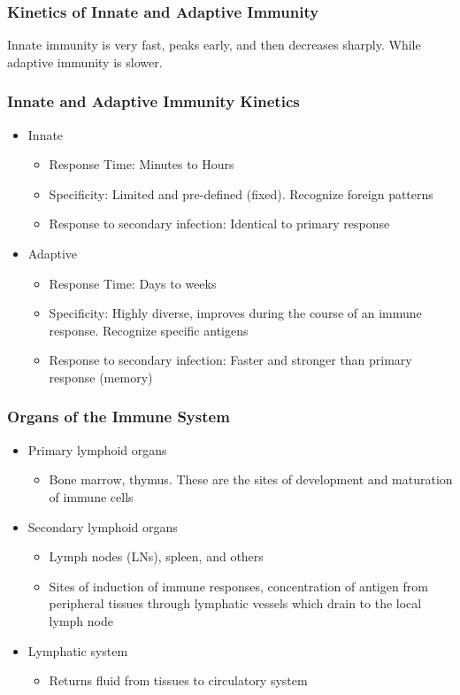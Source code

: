 \begin{itemize}
\begin{itemize}
\subsubsection{Kinetics of Innate and Adaptive Immunity}
Innate immunity is very fast, peaks early, and then decreases sharply. While adaptive immunity is slower.

\subsubsection{Innate and Adaptive Immunity Kinetics}
\begin{itemize}
    \item Innate
    \begin{itemize}
        \item Response Time: Minutes to Hours
        \item Specificity: Limited and pre-defined (fixed). Recognize foreign patterns
        \item Response to secondary infection: Identical to primary response
    \end{itemize}
    \item Adaptive
    \begin{itemize}
        \item Response Time: Days to weeks
        \item Specificity: Highly diverse, improves during the course of an immune response. Recognize specific antigens
        \item Response to secondary infection: Faster and stronger than primary  response (memory)
        
    \end{itemize}
\end{itemize}

\subsubsection{Organs of the Immune System}
\begin{itemize}
    \item Primary lymphoid organs
    \begin{itemize}
        \item Bone marrow, thymus. These are the sites of development and maturation of immune cells
    \end{itemize}
    \item Secondary lymphoid organs
    \begin{itemize}
        \item Lymph nodes (LNs), spleen, and others
        \item Sites of induction of immune responses, concentration of antigen from peripheral tissues through lymphatic vessels which drain to the local lymph node
    \end{itemize}
    \item Lymphatic system
    \begin{itemize}
        \item Returns fluid from tissues to circulatory system
    \end{itemize}
\end{itemize}


\end{itemize}
\end{itemize}
